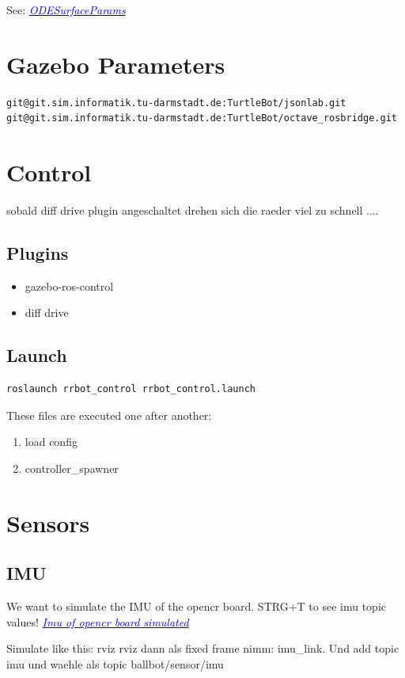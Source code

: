 \documentclass[twoside,colorback,accentcolor=tud4c,11pt]{tudreport}
\newcommand{\mylink}[2] {	\hyperlink{#1}{	\textit{\textcolor{blue}{#2}}}}
\begin{document}
See: \mylink{http://osrf-distributions.s3.amazonaws.com/gazebo/api/dev/classgazebo_1_1physics_1_1ODESurfaceParams.html}{ODESurfaceParams}

\section{Gazebo Parameters}

	\begin{lstlisting}[style=BashInputStyle]
git@git.sim.informatik.tu-darmstadt.de:TurtleBot/jsonlab.git
git@git.sim.informatik.tu-darmstadt.de:TurtleBot/octave_rosbridge.git
	\end{lstlisting}
	
	\section{Control}
	sobald diff drive plugin angeschaltet drehen sich die raeder viel zu schnell ....
	
	
	\subsection{Plugins}
	\begin{itemize}
		\item gazebo-ros-control
		\item diff drive
	\end{itemize}
	
	\subsection{Launch}
	\begin{lstlisting}[style=BashInputStyle]
	roslaunch rrbot_control rrbot_control.launch
	\end{lstlisting}
	
	These files are executed one after another:
	\begin{enumerate}
		\item load config
		\item controller\_spawner
	\end{enumerate}
	
	\section{Sensors}
	\subsection{IMU}
	
		We want to simulate the IMU of the opencr board. STRG+T to see imu topic values!
	\mylink{https://www.youtube.com/watch?v=wXN_7oRHst0}{Imu of opencr board simulated}

	Simulate like this:
	rviz rviz dann als fixed frame nimm: imu\_link. Und add topic imu und waehle als topic ballbot/sensor/imu
	
	
\end{document}
